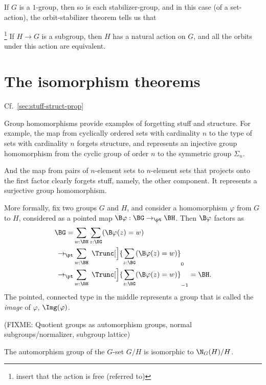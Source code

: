 If $G$ is a $1$-group,
then so is each stabilizer-group,
and in this case (of a set-action),
the orbit-stabilizer theorem
tells us that

\begin{theorem}\footnote{insert that the action is free (referred to)}
\label{thm:lagrange}
  If $H \to G$ is a subgroup, then $H$ has a natural action on $G$,
  and all the orbits under this action are equivalent.
\end{theorem}


\section{The isomorphism theorems}
\label{sec:noether-theorems}

Cf.~\cref{sec:stuff-struct-prop}

Group homomorphisms provide examples of forgetting stuff and structure.
For example, the map from cyclically ordered sets with cardinality $n$
to the type of sets with cardinality $n$ forgets structure,
and represents an injective group homomorphism from the cyclic
group of order $n$ to the symmetric group $\Sigma_n$.

And the map from pairs of $n$-element sets to $n$-element sets
that projects onto the first factor clearly forgets stuff,
namely, the other component.
It represents a surjective group homomorphism.

More formally, fix two groups $G$ and $H$,
and consider a homomorphism $\varphi$ from $G$ to $H$,
considered as a pointed map $\B\varphi : \BG \to_\pt \BH$.
Then $\B\varphi$ factors as
\begin{align*}
  \BG
  = &\sum_{w:\BH}\sum_{z:\BG}(\B\varphi(z)=w)\\
  \to_\pt &\sum_{w:\BH}\;\Trunc[\Big]{\sum_{z:\BG}(\B\varphi(z)=w)}_0\\
  \to_\pt &\sum_{w:\BH}\;\Trunc[\Big]{\sum_{z:\BG}(\B\varphi(z)=w)}_{-1} = \BH.
\end{align*}
The pointed, connected type in the middle represents a group
that is called the \emph{image} of $\varphi$, $\Img(\varphi)$.


(FIXME: Quotient groups as automorphism groups, normal subgroups/normalizer, subgroup lattice)

\begin{lemma}
  \label{lem:aut-orbit}
  The automorphism group of the $G$-set $G/H$ is isomorphic to $\N_G(H)/H$.
\end{lemma}

